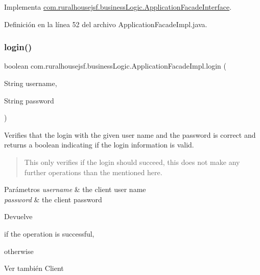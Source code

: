 Implementa \mbox{\hyperlink{interfacecom_1_1ruralhousejsf_1_1business_logic_1_1_application_facade_interface_a4670319006cee17060e0c84695d7195f}{com.\+ruralhousejsf.\+business\+Logic.\+Application\+Facade\+Interface}}.



Definición en la línea 52 del archivo Application\+Facade\+Impl.\+java.

\mbox{\label{classcom_1_1ruralhousejsf_1_1business_logic_1_1_application_facade_impl_a7af883dece6a0de1e1be2b83e3d4a23f}} 
\subsubsection{\texorpdfstring{login()}{login()}}
{\footnotesize\ttfamily boolean com.\+ruralhousejsf.\+business\+Logic.\+Application\+Facade\+Impl.\+login (\begin{DoxyParamCaption}\item[{String}]{username,  }\item[{String}]{password }\end{DoxyParamCaption})}

Verifies that the login with the given user name and the password is correct and returns a boolean indicating if the login information is valid. \begin{quote}
This only verifies if the login should succeed, this does not make any further operations than the mentioned here. \end{quote}



\begin{DoxyParams}{Parámetros}
{\em username} & the client user name \\
\hline
{\em password} & the client password\\
\hline
\end{DoxyParams}
\begin{DoxyReturn}{Devuelve}

\begin{DoxyCode}{0}
\DoxyCodeLine{\textcolor{keyword}{true} }
\end{DoxyCode}
 if the operation is successful,
\begin{DoxyCode}{0}
\DoxyCodeLine{\textcolor{keyword}{false} }
\end{DoxyCode}
 otherwise
\end{DoxyReturn}
\begin{DoxySeeAlso}{Ver también}
Client 
\end{DoxySeeAlso}



